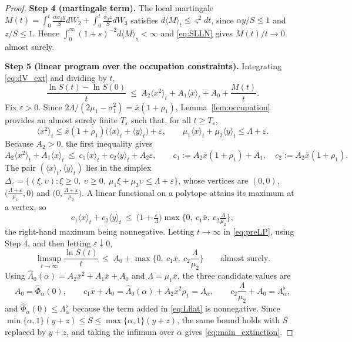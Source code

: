 \documentclass{article}
\newcommand{\avg}[1]{\big\langle #1 \big\rangle_t}
\begin{document}
\begin{proof}
\textbf{Step 4 (martingale term).} The local martingale $M(t)=\int_0^t\frac{\alpha\sigma_2y}{S}dW_2+\int_0^t\frac{\sigma_3z}{S}dW_3$ satisfies $d\langle M\rangle_t\le\varsigma^2dt$, since $\alpha y/S\le1$ and $z/S\le1$. Hence $\int_0^\infty(1+s)^{-2}d\langle M\rangle_s<\infty$ and \eqref{eq:SLLN} gives $M(t)/t\to0$ almost surely.

\textbf{Step 5 (linear  program over the occupation constraints).} Integrating \eqref{eq:dV_ext} and dividing by $t$,
\begin{equation}\label{eq:preLP}
\frac{\ln S(t)-\ln S(0)}{t}\ \le\ A_2\avg{x^2}+A_1\avg{x}+A_0+\frac{M(t)}{t}.
\end{equation}
Fix $\varepsilon>0$. Since $2\Lambda/(2\mu_1-\sigma_1^2)=\bar x(1+\rho_1)$, Lemma~\ref{lem:occupation} provides an almost surely finite $T_\varepsilon$ such that, for all $t\ge T_\varepsilon$,
\[
\avg{x^2}\le \bar x(1+\rho_1)\big(\avg{x}+\avg{y}\big)+\varepsilon,\qquad \mu_1\avg{x}+\mu_2\avg{y}\le\Lambda+\varepsilon .
\]
Because $A_2>0$, the first inequality gives
\[
A_2\avg{x^2}+A_1\avg{x}\ \le\ c_1\avg{x}+c_2\avg{y}+A_2\varepsilon,\qquad c_1:=A_2\bar x(1+\rho_1)+A_1,\quad c_2:=A_2\bar x(1+\rho_1).
\]
The pair $(\avg{x},\avg{y})$ lies in the simplex $\Delta_\varepsilon=\{(\xi,\upsilon):\xi\ge0,\ \upsilon\ge0,\ \mu_1\xi+\mu_2\upsilon\le\Lambda+\varepsilon\}$, whose vertices are $(0,0)$, $\big(\tfrac{\Lambda+\varepsilon}{\mu_1},0\big)$ and $\big(0,\tfrac{\Lambda+\varepsilon}{\mu_2}\big)$. A linear functional on a polytope attains its maximum at a vertex, so
\[
c_1\avg{x}+c_2\avg{y}\ \le\ \Big(1+\tfrac{\varepsilon}{\Lambda}\Big)\max\Big\{0,\ c_1\bar x,\ c_2\tfrac{\Lambda}{\mu_2}\Big\},
\]
the right-hand maximum being nonnegative. Letting $t\to\infty$ in \eqref{eq:preLP}, using Step 4, and then letting $\varepsilon\downarrow0$,
\[
\limsup_{t\to\infty}\frac{\ln S(t)}{t}\ \le\ A_0+\max\Big\{0,\ c_1\bar x,\ c_2\frac{\Lambda}{\mu_2}\Big\}\qquad\text{almost surely.}
\]
Using $\widehat\Lambda_0(\alpha)=A_2\bar x^2+A_1\bar x+A_0$ and $\Lambda=\mu_1\bar x$, the three candidate values are
\[
A_0=\widehat\Phi_\alpha(0),\qquad c_1\bar x+A_0=\widehat\Lambda_0(\alpha)+A_2\bar x^2\rho_1=\Lambda_\alpha,\qquad c_2\frac{\Lambda}{\mu_2}+A_0=\Lambda_\alpha^{\flat},
\]
and $\widehat\Phi_\alpha(0)\le\Lambda_\alpha^\flat$ because the term added in \eqref{eq:Lflat} is nonnegative. Since $\min\{\alpha,1\}(y+z)\le S\le\max\{\alpha,1\}(y+z)$, the same bound holds with $S$ replaced by $y+z$, and taking the infimum over $\alpha$ gives \eqref{eq:main_extinction}.


\end{proof}
\end{document}
